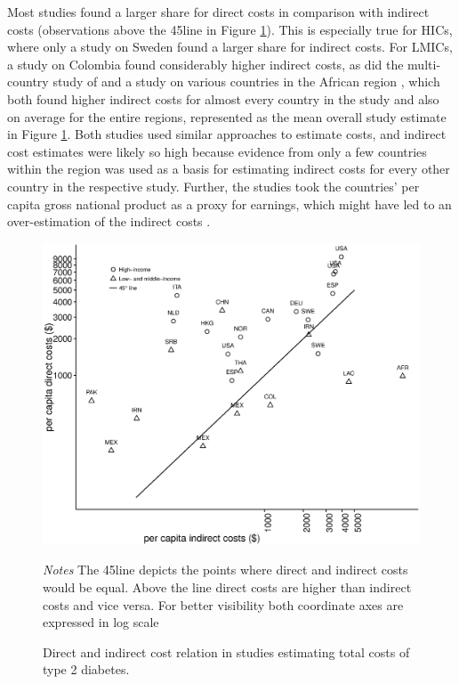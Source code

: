 Most studies found a larger share for direct costs in comparison with indirect costs (observations above the 45\degree  line in Figure \ref{fig:review_direct_indirect}). This is especially true for \acp{HIC}, where only a study on Sweden \parencite{Bolin2009d} found a larger share for indirect costs. For \acp{LMIC}, a study on Colombia \parencite{Gonzalez2009b} found considerably higher indirect costs, as did the multi-country study of \textcite{Barcelo2003} and a study on various countries in the African region \parencite{Kirigia2009}, which both found higher indirect costs for almost every country in the study and also on average for the entire regions, represented as the mean overall study estimate in Figure \ref{fig:review_direct_indirect}.  Both studies used similar approaches to estimate costs, and indirect cost estimates were likely so high because evidence from only a few countries within the region was used as a basis for estimating indirect costs for every other country in the respective study. Further, the studies took the countries' per capita gross national product as a proxy for earnings, which might have led to an over-estimation of the indirect costs \parencite{Kirigia2009}.

\begin{figure}[p]
\caption{\label{fig:review_direct_indirect}Direct and indirect cost relation in studies estimating total costs of type 2 diabetes.}%
\begin{minipage}{\linewidth}
\begin{center}
\includegraphics[width=1\linewidth]{Review/Figures/Fig4.eps}\\
\end{center}
\footnotesize
\textit{Notes} The 45\degree line depicts the points where direct and indirect costs would be equal. Above the line direct costs are higher than indirect costs and vice versa. For better visibility both coordinate axes are expressed in log scale
\end{minipage}
\end{figure}

